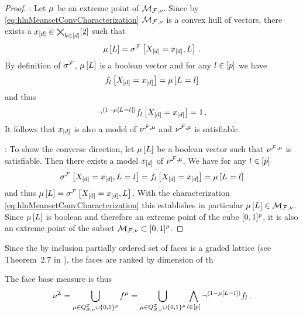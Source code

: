 \begin{proof}
	\proofrightsymbol: Let $\mu$ be an extreme point of $\mathcal{M}_{\mathcal{F},\nu}$.
		Since by \eqref{eq:hlnMeansetConvCharacterization} $\mathcal{M}_{\mathcal{F},\nu}$ is a convex hull of vectors, there exists a $x_{[d]}\in\bigtimes_{k\in[d]}[2]$ such that
			\[ \mu\left[L\right] = \sigma^{\mathcal{F}}\left[X_{[d]}=x_{[d]},L\right]  \, . \]
		By definition of $\sigma^{\mathcal{F}}$, $\mu\left[L\right]$ is a boolean vector and for any $l\in[p]$ we have
			\[ f_{l}\left[X_{[d]}=x_{[d]}\right] = \mu\left[L_{}=l_{}\right] \]
		and thus
			\[ \lnot^{(1-\mu\left[L_{}=l_{}\right])} f_{l}\left[X_{[d]}=x_{[d]}\right] = 1\, .  \]
		It follows that $x_{[d]}$ is also a model of $\nu^{\mathcal{F},\mu}$ and $\nu^{\mathcal{F},\mu}$ is satisfiable.

	\proofleftsymbol: To show the converse direction, let $\mu\left[L\right]$ be a boolean vector such that $\nu^{\mathcal{F},\mu}$ is satisfiable.
		Then there exists a model $x_{[d]}$ of $\nu^{\mathcal{F},\mu}$.
		We have for any $l\in[p]$
			\[ \sigma^{\mathcal{F}}\left[X_{[d]}=x_{[d]},L_{}=l_{}\right] =  f_{l}\left[X_{[d]}=x_{[d]}\right] = \mu\left[L_{}=l_{}\right] \]
		and thus $\mu\left[L\right]=\sigma^{\mathcal{F}}\left[X_{[d]}=x_{[d]},L\right]$.
		With the characterization \eqref{eq:hlnMeansetConvCharacterization} this establishes in particular $\mu\left[L\right]\in\mathcal{M}_{\mathcal{F},\nu}$.
		Since $\mu\left[L\right]$ is boolean and therefore an extreme point of the cube $[0,1]^{p}$, it is also an extreme point of the subset $\mathcal{M}_{\mathcal{F},\nu}\subset[0,1]^{p}$.
\end{proof}


Since the by inclusion partially ordered set of faces is a graded lattice (see Theorem~2.7 in \cite{ziegler_lectures_2013}), the faces are ranked by dimension of th%

The face base measure is thus
\begin{align*}
	\nu^{\mathcal{I}}
	= \bigcup_{\mu\in Q^{\mathcal{I}}_{\mathcal{S},\nu}\cup\{0,1\}^{p}} f^{\mu}
	= \bigcup_{\mu\in Q^{\mathcal{I}}_{\mathcal{S},\nu}\cup\{0,1\}^{p}} \bigwedge_{l\in[p]} \lnot^{(1-\mu\left[L_{}=l_{}\right])} f_{l} \, .
\end{align*}



